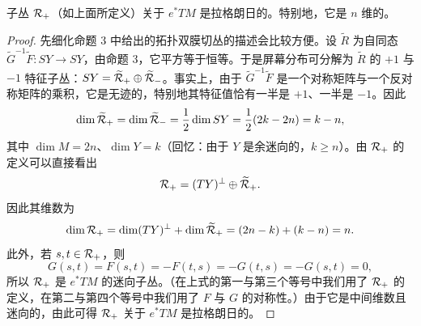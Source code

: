 \begin{proposition}[6] 子丛 $\mathcal{R}_+$（如上面所定义）关于 $e^*TM$ 是拉格朗日的。特别地，它是 $n$ 维的。\end{proposition}

\begin{proof}
先细化命题 3 中给出的拓扑双膜切丛的描述会比较方便。设 $\widetilde R$ 为自同态 $\widetilde G^{-1}\widetilde F:SY\to SY$，由命题 3，它平方等于恒等。于是屏幕分布可分解为 $\widetilde R$ 的 $+1$ 与 $-1$ 特征子丛：$SY=\widetilde{\mathcal{R}}_+\oplus\widetilde{\mathcal{R}}_-$。事实上，由于 $\widetilde G^{-1}\widetilde F$ 是一个对称矩阵与一个反对称矩阵的乘积，它是无迹的，特别地其特征值恰有一半是 $+1$、一半是 $-1$。因此
\[
  \dim\widetilde{\mathcal{R}}_+=\dim\widetilde{\mathcal{R}}_-=\frac{1}{2}\dim SY=\frac{1}{2}(2k-2n)=k-n,
\]
其中 $\dim M=2n$、$\dim Y=k$（回忆：由于 $Y$ 是余迷向的，$k\ge n$）。由 $\mathcal{R}_+$ 的定义可以直接看出
\[
  \mathcal{R}_+=(TY)^\perp\oplus\widetilde{\mathcal{R}}_+ .
\]
因此其维数为
\[
  \dim\mathcal{R}_+=\dim (TY)^\perp+\dim\widetilde{\mathcal{R}}_+=(2n-k)+(k-n)=n .
\]
此外，若 $s,t\in\mathcal{R}_+$，则
\[
  G(s,t)=F(s,t)=-F(t,s)=-G(t,s)=-G(s,t)=0,
\]
所以 $\mathcal{R}_+$ 是 $e^*TM$ 的迷向子丛。（在上式的第一与第三个等号中我们用了 $\mathcal{R}_+$ 的定义，在第二与第四个等号中我们用了 $F$ 与 $G$ 的对称性。）由于它是中间维数且迷向的，由此可得 $\mathcal{R}_+$ 关于 $e^*TM$ 是拉格朗日的。\end{proof}

